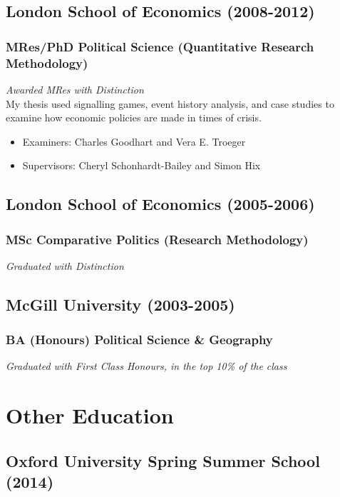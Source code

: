 \documentclass[a4paper]{article}
\begin{document}
{\subsection*{London School of Economics (2008-2012)}
\subsubsection*{MRes/PhD Political Science (Quantitative Research Methodology)}

\emph{Awarded MRes with Distinction} \\

\noindent My thesis used signalling games, event history analysis, and case studies to examine how economic policies are made in times of crisis.

\begin{itemize}
    \item Examiners: Charles Goodhart and Vera E. Troeger
    \item Supervisors: Cheryl Schonhardt-Bailey and Simon Hix
\end{itemize}

\subsection*{London School of Economics (2005-2006)}
\subsubsection*{MSc Comparative Politics (Research Methodology)}

{\emph{Graduated with Distinction}}

\subsection*{McGill University (2003-2005)}
\subsubsection*{BA (Honours) Political Science \& Geography}

{\emph{Graduated with First Class Honours, in the top 10\% of the class}}

\section*{Other Education}

\subsection*{Oxford University Spring Summer School (2014)}

}
\end{document}
